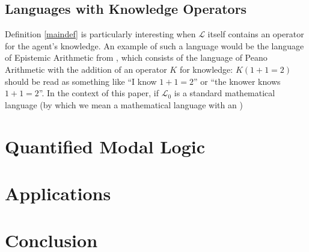 \documentclass[runningheads]{llncs}
\begin{document}
\subsection{Languages with Knowledge Operators}

Definition \ref{maindef} is particularly interesting when $\mathscr L$ itself
contains an operator for the agent's knowledge. An example of such a language would be
the language of Epistemic Arithmetic from \cite{shapiro}, which consists of the
language of Peano Arithmetic with the addition of an operator $K$ for knowledge:
$K(1+1=2)$ should be read as something like
``I know $1+1=2$'' or ``the knower knows $1+1=2$''. In the context of this paper,
if $\mathscr L_0$ is a standard mathematical language (by which we mean a mathematical
language with an )

\section{Quantified Modal Logic}
\label{quantifiedsection}

\section{Applications}
\label{appsection}

\section{Conclusion}
\label{conclusionsection}



\end{document}

